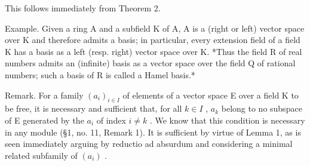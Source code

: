 This follows immediately from Theorem 2.

Example. Given a ring A and a subfield K of A, A is a (right or left) vector space over K and therefore admits a basis; in particular, every extension field of a field K has a basis as a left (resp. right) vector space over K. *Thus the field R of real numbers admits an (infinite) basis as a vector space over the field Q of rational numbers; such a basis of R is called a Hamel basis.*

Remark. For a family \((a_{i})_{i\in I}\) of elements of a vector space E over a field K to be free, it is necessary and sufficient that, for all \(k\in I\) , \(a_{k}\) belong to no subspace of E generated by the \(a_{i}\) of index \(i\neq k\) . We know that this condition is necessary in any module (§1, no. 11, Remark 1). It is sufficient by virtue of Lemma 1, as is seen immediately arguing by reductio ad absurdum and considering a minimal related subfamily of \((a_{i})\) .

